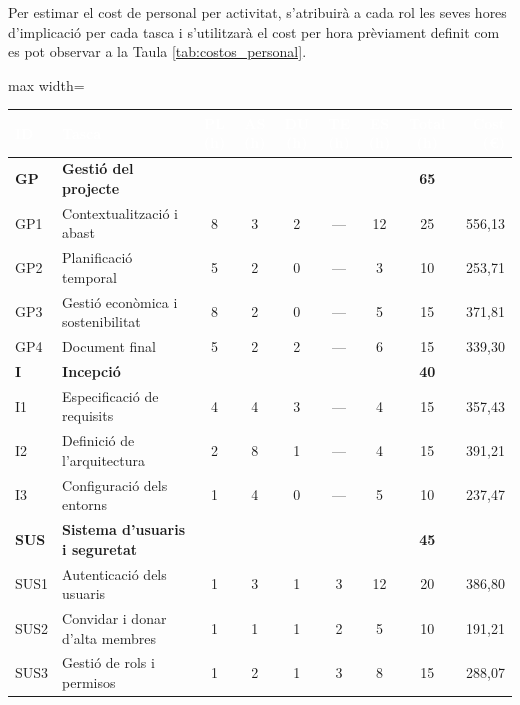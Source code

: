 \documentclass[11pt,a4paper]{report}
\begin{document}
Per estimar el cost de personal per activitat, s'atribuirà a cada rol les seves hores d'implicació per cada tasca i s'utilitzarà el cost per hora prèviament definit com es pot observar a la Taula \ref{tab:costos_personal}.

\begin{table}[H]
    \centering
    \footnotesize
    \renewcommand{\arraystretch}{0.9}
    \begin{adjustbox}{max width=\textwidth}
    \begin{tabular}{|l|l|c|c|c|c|c|c|r|}
        \hline
        \rowcolor{oceanblue}
        \textcolor{white}{\textbf{ID}} &
        \textcolor{white}{\textbf{Tasca}} &
        \textcolor{white}{\textbf{PL (h)}} &
        \textcolor{white}{\textbf{AS (h)}} &
        \textcolor{white}{\textbf{DU (h)}} &
        \textcolor{white}{\textbf{TE (h)}} &
        \textcolor{white}{\textbf{ES (h)}} &
        \textcolor{white}{\textbf{Total (h)}} &
        \textcolor{white}{\textbf{Cost (€)}} \\
        \hline

        \rowcolor{gray!20}
        \textbf{GP} & \textbf{Gestió del projecte} & & & & & & \textbf{65} & \\
        \hline
        GP1 & Contextualització i abast            &  8 & 3 & 2 & --- & 12 & 25 & 556,13 \\
        \hline
        GP2 & Planificació temporal                &  5 & 2 & 0 & --- &  3 & 10 & 253,71 \\
        \hline
        GP3 & Gestió econòmica i sostenibilitat    &  8 & 2 & 0 & --- &  5 & 15 & 371,81 \\
        \hline
        GP4 & Document final                       &  5 & 2 & 2 & --- &  6 & 15 & 339,30 \\
        \hline

        \rowcolor{gray!20}
        \textbf{I} & \textbf{Incepció} & & & & & & \textbf{40} & \\
        \hline
        I1  & Especificació de requisits           &  4 & 4 & 3 & --- &  4 & 15 & 357,43 \\
        \hline
        I2  & Definició de l'arquitectura          &  2 & 8 & 1 & --- &  4 & 15 & 391,21 \\
        \hline
        I3  & Configuració dels entorns            &  1 & 4 & 0 & --- &  5 & 10 & 237,47 \\
        \hline

        \rowcolor{gray!20}
        \textbf{SUS} & \textbf{Sistema d'usuaris i seguretat} & & & & & & \textbf{45} & \\
        \hline
        SUS1 & Autenticació dels usuaris           &  1 & 3 & 1 &  3 & 12 & 20 & 386,80 \\
        \hline
        SUS2 & Convidar i donar d'alta membres     &  1 & 1 & 1 &  2 &  5 & 10 & 191,21 \\
        \hline
        SUS3 & Gestió de rols i permisos           &  1 & 2 & 1 &  3 &  8 & 15 & 288,07 \\
        \hline


\end{tabular}
\end{adjustbox}
\end{table}
\end{document}
